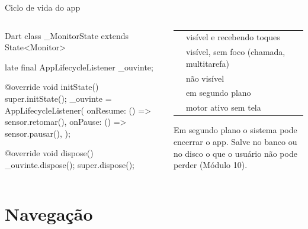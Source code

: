 \documentclass[aspectratio=169,10pt]{beamer}
\begin{document}
\begin{frame}[fragile]{Ciclo de vida do app}
  \begin{columns}[T]
    \begin{column}{0.54\textwidth}
\begin{codigo}[title=Pausando o sensor em segundo plano]{Dart}
class _MonitorState extends State<Monitor> {
  late final AppLifecycleListener _ouvinte;

  @override
  void initState() {
    super.initState();
    _ouvinte = AppLifecycleListener(
      onResume: () => sensor.retomar(),
      onPause: () => sensor.pausar(),
    );
  }

  @override
  void dispose() {
    _ouvinte.dispose();
    super.dispose();
  }
}
\end{codigo}
    \end{column}
    \begin{column}{0.44\textwidth}
      \scriptsize
      \begin{tabularx}{\linewidth}{@{}l L@{}}
        \toprule
         &  \\
        \midrule
         & visível e recebendo toques \\
         & visível, sem foco (chamada, multitarefa) \\
         & não visível \\
         & em segundo plano \\
         & motor ativo sem tela \\
        \bottomrule
      \end{tabularx}
      \begin{atencao}
        Em segundo plano o sistema pode encerrar o app. Salve no banco ou no disco o que o usuário não pode perder (Módulo 10).
      \end{atencao}
    \end{column}
  \end{columns}
\end{frame}

\section{Navegação}
\end{document}
